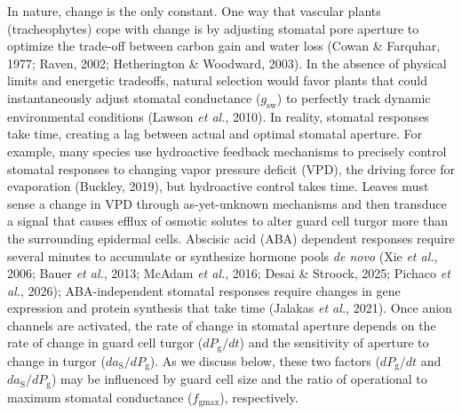 \documentclass[
  letterpaper,
  DIV=11,
  numbers=noendperiod]{scrartcl}
\newcommand{\fgmax}{$f_\mathrm{gmax}$}
\newcommand{\gsw}{$g_\mathrm{sw}$}
\begin{document}
In nature, change is the only constant. One way that vascular plants
(tracheophytes) cope with change is by adjusting stomatal pore aperture
to optimize the trade-off between carbon gain and water loss (Cowan \&
Farquhar, 1977; Raven, 2002; Hetherington \& Woodward, 2003). In the
absence of physical limits and energetic tradeoffs, natural selection
would favor plants that could instantaneously adjust stomatal
conductance (\gsw) to perfectly track dynamic environmental conditions
(Lawson \emph{et al.}, 2010). In reality, stomatal responses take time,
creating a lag between actual and optimal stomatal aperture. For
example, many species use hydroactive feedback mechanisms to precisely
control stomatal responses to changing vapor pressure deficit (VPD), the
driving force for evaporation (Buckley, 2019), but hydroactive control
takes time. Leaves must sense a change in VPD through as-yet-unknown
mechanisms and then transduce a signal that causes efflux of osmotic
solutes to alter guard cell turgor more than the surrounding epidermal
cells. Abscisic acid (ABA) dependent responses require several minutes
to accumulate or synthesize hormone pools \emph{de novo} (Xie \emph{et
al.}, 2006; Bauer \emph{et al.}, 2013; McAdam \emph{et al.}, 2016; Desai
\& Stroock, 2025; Pichaco \emph{et al.}, 2026); ABA-independent stomatal
responses require changes in gene expression and protein synthesis that
take time (Jalakas \emph{et al.}, 2021). Once anion channels are
activated, the rate of change in stomatal aperture depends on the rate
of change in guard cell turgor (\(d P_\mathrm{g} / dt\)) and the
sensitivity of aperture to change in turgor
(\(d a_\mathrm{S} / d P_\mathrm{g}\)). As we discuss below, these two
factors (\(d P_\mathrm{g} / dt\) and
\(d a_\mathrm{S} / d P_\mathrm{g}\)) may be influenced by guard cell
size and the ratio of operational to maximum stomatal conductance
(\fgmax), respectively.
\end{document}
